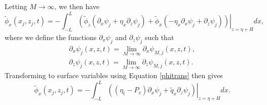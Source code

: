 \documentclass[a4paper,11pt]{article}
\newcommand{\p}{\partial}
\begin{document}
Letting $M\rightarrow \infty$, we then have 
\[
\tilde{\phi}_{x}(x_{j},z_{j},t) = -\int_{-L}^{L} \left.\left(\tilde{\phi}_{z}\left(\p_{x}\psi_{j}+ \eta_{x}\p_{z}\psi_{j}\right)+\tilde{\phi}_{x}\left(-\eta_{x}\p_{x}\psi_{j} + \p_{z}\psi_{j} \right) \right)\right|_{z=\eta+H}dx,
\]
where we define the functions $\p_{x}\psi_{j}$ and $\p_{z}\psi_{j}$ such that 
\begin{align*}
\p_{x}\psi_{j}(x,z,t) = \lim_{M\rightarrow\infty}\p_{x}\psi_{M,j}(x,z,t), \\
\p_{z}\psi_{j}(x,z,t) = \lim_{M\rightarrow\infty}\p_{z}\psi_{M,j}(x,z,t).
\end{align*}
Transforming to surface variables using Equation \eqref{phitrans} then gives
\[
\tilde{\phi}_{x}(x_{j},z_{j},t) = -\int_{-L}^{L}\left.\left(\left(\eta_{t}-P_{v}\right)\p_{x}\psi_{j} + \tilde{q}_{x}\p_{z}\psi_{j} \right) \right|_{z=\eta+H} dx.
\]
\end{document}
